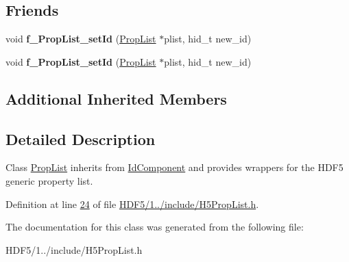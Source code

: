 \subsection*{Friends}
\begin{DoxyCompactItemize}
\item 
\mbox{\label{class_h5_1_1_prop_list_a6636793e5aaf921a442ced29ebeaf13f}} 
void {\bfseries f\+\_\+\+Prop\+List\+\_\+set\+Id} (\hyperlink{class_h5_1_1_prop_list}{Prop\+List} $\ast$plist, hid\+\_\+t new\+\_\+id)
\item 
\mbox{\label{class_h5_1_1_prop_list_a6636793e5aaf921a442ced29ebeaf13f}} 
void {\bfseries f\+\_\+\+Prop\+List\+\_\+set\+Id} (\hyperlink{class_h5_1_1_prop_list}{Prop\+List} $\ast$plist, hid\+\_\+t new\+\_\+id)
\end{DoxyCompactItemize}
\subsection*{Additional Inherited Members}


\subsection{Detailed Description}
Class \hyperlink{class_h5_1_1_prop_list}{Prop\+List} inherits from \hyperlink{class_h5_1_1_id_component}{Id\+Component} and provides wrappers for the H\+D\+F5 generic property list. 

Definition at line \hyperlink{_h_d_f5_21_810_81_2include_2_h5_prop_list_8h_source_l00024}{24} of file \hyperlink{_h_d_f5_21_810_81_2include_2_h5_prop_list_8h_source}{H\+D\+F5/1../include/\+H5\+Prop\+List.\+h}.



The documentation for this class was generated from the following file\+:\begin{DoxyCompactItemize}
\item 
H\+D\+F5/1../include/\+H5\+Prop\+List.\+h\end{DoxyCompactItemize}
